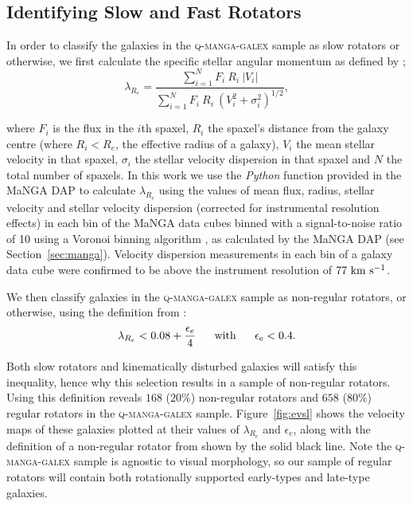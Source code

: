 \documentclass[useAMS,usenatbib]{mn2e}
\begin{document}
\subsection{Identifying Slow and Fast Rotators}\label{sec:fvs}

In order to classify the galaxies in the \textsc{q-manga-galex} sample as slow rotators or otherwise, we first calculate the specific stellar angular momentum as defined by \cite{emsellem07, emsellem11};
\begin{equation}
\lambda_{R_{e}} = \frac{\sum_{i=1}^{N} F_i\ R_i\ |V_i|}{\sum_{i=1}^{N} F_i\ R_i\ (V_i^2 + \sigma_i^2)^{1/2}},
\end{equation}	

where $F_i$ is the flux in the $i$th spaxel, $R_i$ the spaxel's distance from the galaxy centre (where $R_i < R_e$, the effective radius of a galaxy), $V_i$ the mean stellar velocity in that spaxel, $\sigma_i$ the stellar velocity dispersion in that spaxel and $N$ the total number of spaxels. In this work we use the \emph{Python} function provided in the MaNGA DAP to calculate $\lambda_{R_{e}}$ using the values of mean flux, radius, stellar velocity and stellar velocity dispersion (corrected for instrumental resolution effects) in each bin of the MaNGA data cubes binned with a signal-to-noise ratio of 10 using a Voronoi binning algorithm \citep{cappellari03}, as calculated by the MaNGA DAP (see Section~\ref{sec:manga}). Velocity dispersion measurements in each bin of a galaxy data cube were confirmed to be above the instrument resolution of $77~\rm{km}~\rm{s}^{-1}$.

We then classify galaxies in the \textsc{q-manga-galex} sample as non-regular rotators, or otherwise, using the definition from \cite{cappellari16}:
\begin{equation}\label{eq:fvs}
\lambda_{R_{e}} < 0.08 + \frac{\epsilon_e}{4} ~~~~~ \rm{with} ~~~~~ \epsilon_e < 0.4.
\end{equation}

Both slow rotators and kinematically disturbed galaxies will satisfy this inequality, hence why this selection results in a sample of non-regular rotators.  Using this definition reveals $168$ ($20\%$) non-regular rotators and $658$ ($80\%$) regular rotators in the \textsc{q-manga-galex} sample. Figure~\ref{fig:evsl} shows the velocity maps of these galaxies plotted at their values of $\lambda_{R_{e}}$ and $\epsilon_e$, along with the definition of a non-regular rotator from \cite{cappellari16} shown by the solid black line. Note the \textsc{q-manga-galex} sample is agnostic to visual morphology, so our sample of regular rotators will contain both rotationally supported early-types and late-type galaxies. 
\end{document}
